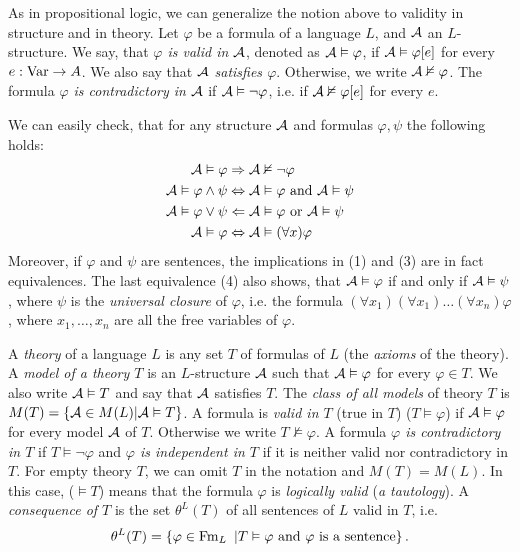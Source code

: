 As in propositional logic, we can generalize the notion above to validity in structure and in theory. Let $\varphi$ be a formula of a language $L$, and $\mathcal{A}$ an $L$-structure. We say, that \emph{$\varphi$ is valid in $\mathcal{A}$}, denoted as $\mathcal{A} \vDash \varphi$, if $\mathcal{A} \vDash \varphi[e]$ for every $e: \operatorname{Var} \to A$. We also say that \emph{$\mathcal{A}$ satisfies $\varphi$}. Otherwise, we write $\mathcal{A} \nvDash \varphi$. The formula \emph{$\varphi$ is contradictory in $\mathcal{A}$} if $\mathcal{A} \vDash \neg \varphi$, i.e. if $\mathcal{A} \nvDash \varphi[e]$ for every $e$.

We can easily check, that for any structure $\mathcal{A}$ and formulas $\varphi, \psi$ the following holds:
\begin{align}
	\mathcal{A} \vDash \varphi & \Rightarrow \mathcal{A} \nvDash \neg \varphi \\
	\mathcal{A} \vDash \varphi \land \psi & \Leftrightarrow \mathcal{A} \vDash \varphi \text{ and } \mathcal{A} \vDash \psi\\
	\mathcal{A} \vDash \varphi \lor \psi & \Leftarrow \mathcal{A} \vDash \varphi \text{ or } \mathcal{A} \vDash \psi\\
	\mathcal{A} \vDash \varphi & \Leftrightarrow \mathcal{A} \vDash (\forall x)\varphi
\end{align}
Moreover, if $\varphi$ and $\psi$ are sentences, the implications in (1) and (3) are in fact equivalences. The last equivalence (4) also shows, that $\mathcal{A} \vDash \varphi$ if and only if $\mathcal{A} \vDash \psi$, where $\psi$ is the \emph{universal closure} of $\varphi$, i.e. the formula $(\forall x_1)(\forall x_1) \dots (\forall x_n)\varphi$, where $x_1, \dots, x_n$ are all the free variables of $\varphi$.

A \emph{theory} of a language $L$ is any set $T$ of formulas of $L$ (the \emph{axioms} of the theory). A \emph{model of a theory $T$} is an $L$-structure $\mathcal{A}$ such that $\mathcal{A} \vDash \varphi$ for every $\varphi \in T$. We also write $\mathcal{A} \vDash T$ and say that $\mathcal{A}$ satisfies $T$. The \emph{class of all models} of theory $T$ is $M(T) = \{\mathcal{A} \in M(L) | \mathcal{A} \vDash T\}$. A formula is \emph{valid in $T$} (true in $T$) ($T\vDash \varphi$) if $\mathcal{A} \vDash \varphi$ for every model $\mathcal{A}$ of $T$. Otherwise we write $T \nvDash \varphi$. A formula \emph{$\varphi$ is contradictory in $T$} if $T \vDash \neg \varphi$ and \emph{$\varphi$ is independent in $T$} if it is neither valid nor contradictory in $T$. For empty theory $T$, we can omit $T$ in the notation and $M(T)=M(L)$. In this case, ($\vDash T$) means that the formula $\varphi$ is \emph{logically valid} (\emph{a tautology}). A \emph{consequence of $T$} is the set $\theta^L(T)$ of all sentences of $L$ valid in $T$, i.e. $$\theta^L(T) = \{\varphi \in \operatorname{Fm}_L\ | T\vDash \varphi \text{ and } \varphi \text{ is a sentence}\}\,.$$

